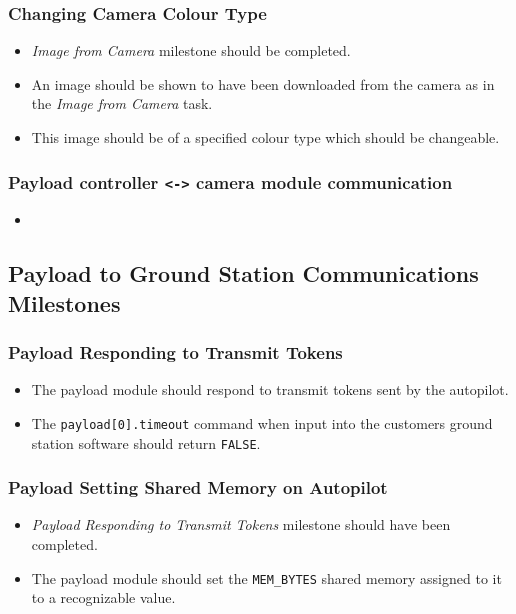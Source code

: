 	\subsubsection{Changing Camera Colour Type}
		\begin{itemize}
			\item 	\emph{Image from Camera} milestone should be completed.
			\item 	An image should be shown to have been downloaded 
				from the camera as in the \emph{Image from Camera}
				task.
			\item 	This image should be of a specified colour type which
				should be changeable.
		\end{itemize}

	\subsubsection{Payload controller \verb+<->+ camera module communication}
		\begin{itemize}
			\item
		\end{itemize}


\subsection{Payload to Ground Station Communications Milestones}
	\subsubsection{Payload Responding to Transmit Tokens}
		\begin{itemize}
			\item 	The payload module should respond to transmit tokens
				sent by the autopilot. 
			\item 	The \verb+payload[0].timeout+ command when input into
				the customers ground station software should return 
				\verb+FALSE+.
		\end{itemize}

	\subsubsection{Payload Setting Shared Memory on Autopilot}
		\begin{itemize}
			\item 	\emph{Payload Responding to Transmit Tokens} milestone
				should have been completed.
			\item 	The payload module should set the \verb+MEM_BYTES+ 
				shared memory assigned to it to a recognizable value.
		\end{itemize}

